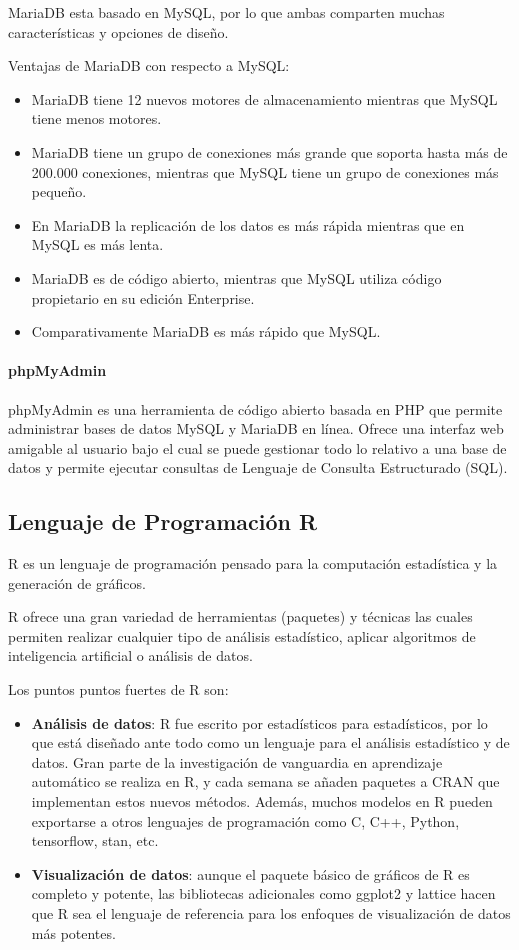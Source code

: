 \documentclass[../../main.tex]{subfiles}
\begin{document}
MariaDB esta basado en MySQL, por lo que ambas comparten muchas características y opciones de diseño.

Ventajas de MariaDB con respecto a MySQL:
\begin{itemize}
    \item MariaDB tiene 12 nuevos motores de almacenamiento mientras que MySQL tiene menos motores.
    \item MariaDB tiene un grupo de conexiones más grande que soporta hasta más de 200.000 conexiones, mientras que MySQL tiene un grupo de conexiones más pequeño.
    \item En MariaDB la replicación de los datos es más rápida mientras que en MySQL es más lenta.
    \item MariaDB es de código abierto, mientras que MySQL utiliza código propietario en su edición Enterprise.
    \item Comparativamente MariaDB es más rápido que MySQL.
\end{itemize}

\paragraph{phpMyAdmin}
phpMyAdmin\cite{doc12} es una herramienta de código abierto basada en PHP que permite administrar bases de datos MySQL y MariaDB en línea. Ofrece una interfaz web amigable al usuario bajo el cual se puede gestionar todo lo relativo a una base de datos y permite ejecutar consultas de Lenguaje de Consulta Estructurado (SQL).
\newpage
\cleardoublepage



\subsection{Lenguaje de Programación R}
R\cite{doc16} es un lenguaje de programación pensado para la computación estadística y la generación de gráficos. 

R ofrece una gran variedad de herramientas (paquetes) y técnicas las cuales permiten realizar cualquier tipo de análisis estadístico, aplicar algoritmos de inteligencia artificial o análisis de datos.

Los puntos puntos fuertes de R son:
\begin{itemize}
    \item \textbf{Análisis de datos}: R fue escrito por estadísticos para estadísticos, por lo que está diseñado ante todo como un lenguaje para el análisis estadístico y de datos. Gran parte de la investigación de vanguardia en aprendizaje automático se realiza en R, y cada semana se añaden paquetes a CRAN que implementan estos nuevos métodos. Además, muchos modelos en R pueden exportarse a otros lenguajes de programación como C, C++, Python, tensorflow, stan, etc.
    
    \item \textbf{Visualización de datos}: aunque el paquete básico de gráficos de R es completo y potente, las bibliotecas adicionales como ggplot2 y lattice hacen que R sea el lenguaje de referencia para los enfoques de visualización de datos más potentes.
\end{itemize}
\newpage
\cleardoublepage
\end{document}
